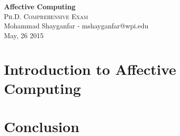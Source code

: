 \documentclass[11pt]{article}
\begin{document}

\begin{center}
{\LARGE{\textbf{Affective Computing}}} \\
\Large\textsc{Ph.D. Comprehensive Exam} \\[1em]
\large\textnormal{Mohammad Shayganfar - mshayganfar@wpi.edu} \\
\large\textnormal{May, 26 2015}
\end{center}

\section{Introduction to Affective Computing}

\section{Conclusion}



\end{document}
